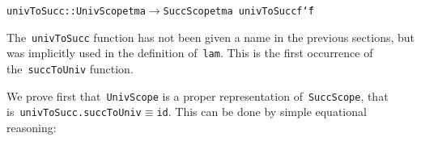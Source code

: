 \documentclass[9pt,authoryear]{sigplanconf}
\begin{document}
%
{\noindent}%
%
\vphantom{$\{$}\texttt{univToSucc}\texttt{\mbox{\hspace{0.50em}}}\texttt{{:}{:}}\texttt{\mbox{\hspace{0.50em}}}\texttt{UnivScope}\texttt{\mbox{\hspace{0.50em}}}\texttt{tm}\texttt{\mbox{\hspace{0.50em}}}\texttt{a}\texttt{\mbox{\hspace{0.50em}}}\texttt{$ \rightarrow $}\texttt{\mbox{\hspace{0.50em}}}\texttt{SuccScope}\texttt{\mbox{\hspace{0.50em}}}\texttt{tm}\texttt{\mbox{\hspace{0.50em}}}\texttt{a}\texttt{{\nopagebreak \newline%
}\vphantom{$\{$}}\texttt{univToSucc}\texttt{\mbox{\hspace{0.50em}}}\texttt{f}\texttt{\mbox{\hspace{0.50em}}}\texttt{{\char `\=}}\texttt{\mbox{\hspace{0.50em}}}\texttt{f}\texttt{\mbox{\hspace{0.50em}}}\texttt{\makebox[1.22ex][l]{$ {(} $}}\texttt{\makebox[1.22ex][r]{$ {)} $}}\texttt{{\nopagebreak \newline%
}\vphantom{$\{$}}%


%
The{~}\texttt{univToSucc} function has not been given a name in the
    previous sections, but was implicitly used in the definition
    of{~}\texttt{lam}. This is the first occurrence of the{~}\texttt{succToUniv}    function.%


%
We prove first that{~}\texttt{UnivScope} is a proper representation
    of{~}\texttt{SuccScope}, that is{~}\texttt{univToSucc}\texttt{\mbox{\hspace{0.50em}}}\texttt{.}\texttt{\mbox{\hspace{0.50em}}}\texttt{succToUniv}\texttt{\mbox{\hspace{0.50em}}}\texttt{$ \equiv $}\texttt{\mbox{\hspace{0.50em}}}\texttt{id}. This can
    be done by simple equational reasoning{:}%


%
%


{\nopagebreak }
\end{document}
